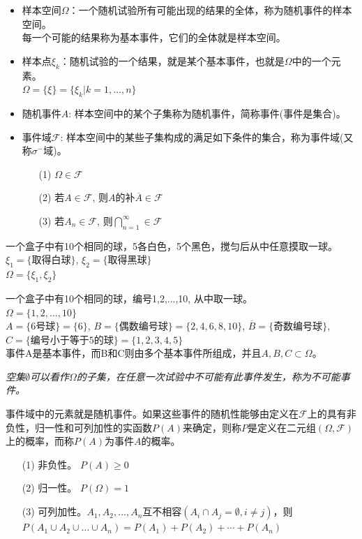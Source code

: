 \documentclass[xcolor=svgnames,serif,table,10pt]{beamer}
\begin{document}
\begin{frame}
\begin{itemize}
	\item 样本空间$\Omega$：一个随机试验所有可能出现的结果的全体，称为随机事件的样本空间。\\
	每一个可能的结果称为基本事件，它们的全体就是样本空间。
	\item 样本点$\xi_k$：随机试验的一个结果，就是某个基本事件，也就是$\Omega$中的一个元素。\\
	$\Omega=\{\xi\}=\{\xi_k|k=1,\dots,n\}$
	\item 随机事件$A$: 样本空间中的某个子集称为随机事件，简称事件(事件是集合)。
    \item 事件域$\mathcal{F}$: 样本空间中的某些子集构成的满足如下条件的集合，称为事件域(又称$\sigma^-$域)。
	\begin{itemize}
		\item[(1)] $\Omega\in\mathcal{F}$
		\item[(2)] 若$A\in\mathcal{F}$, 则$A$的补$\overline{A}\in\mathcal{F}$
		\item[(3)] 若$A_n\in\mathcal{F}$, 则$\bigcap_{n=1}^{\infty}\in\mathcal{F}$
	\end{itemize}
\end{itemize}
\end{frame}

\begin{frame}
\begin{example}
	一个盒子中有10个相同的球，5各白色，5个黑色，搅匀后从中任意摸取一球。\\
	$\xi_1=\{\text{取得白球} \}$, $\xi_2=\{\text{取得黑球} \}$\\
	$\Omega=\{\xi_1,\xi_2\}$
\end{example}
\begin{example}
	一个盒子中有10个相同的球，编号1,2,...,10, 从中取一球。\\
	$\Omega=\{1,2,\dots,10\}$\\
	$A=\{\text{6号球} \}=\{6\}$, $B=\{\text{偶数编号球} \}=\{2,4,6,8,10\}$, $\overline{B}=\{\text{奇数编号球}\}$,$C=\{\text{编号小于等于5的球} \}=\{1,2,3,4,5\}$\\
	事件A是基本事件，而B和C则由多个基本事件所组成，并且$A,B,C\subset\Omega$。
\end{example}
\textit{空集$\emptyset$可以看作$\Omega$的子集，在任意一次试验中不可能有此事件发生，称为不可能事件。}
\end{frame}

\begin{frame}
  事件域中的元素就是随机事件。如果这些事件的随机性能够由定义在$\mathcal{F}$上的具有非负性，归一性和可列加性的实函数$P(A)$来确定，则称$P$是定义在二元组$(\Omega,\mathcal{F})$上的概率，而称$P(A)$为事件$A$的概率。
  \begin{enumerate}
  	\item[(1)] 非负性。 $P(A)\ge 0$
  	\item[(2)] 归一性。 $P(\Omega)=1$
    \item[(3)] 可列加性。$A_1,A_2,...,A_n$互不相容$(A_i\cap A_j=\emptyset,i\ne j)$，则$P(A_1\cup A_2\cup\dots\cup A_n) = P(A_1)+P(A_2)+\cdots+P(A_n)$
  \end{enumerate}
\end{frame}
\end{document}
